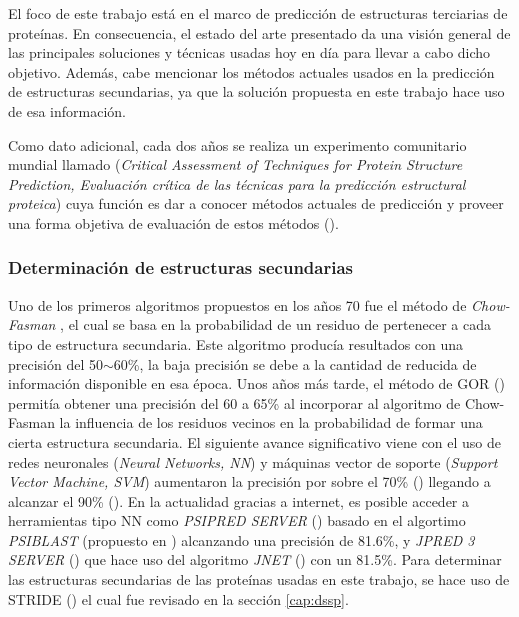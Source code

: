 El foco de este trabajo está en el marco de predicción de estructuras terciarias de proteínas. En consecuencia, el estado del arte presentado da una visión general de las principales soluciones y técnicas usadas hoy en día para llevar a cabo dicho objetivo. Además, cabe mencionar los métodos actuales usados en la predicción de estructuras secundarias, ya que la solución propuesta en este trabajo hace uso de esa información.

Como dato adicional, cada dos años se realiza un experimento comunitario mundial llamado  (\textit{Critical Assessment of Techniques for Protein Structure Prediction, Evaluación crítica de las técnicas para la predicción estructural proteica}) cuya función es dar a conocer métodos actuales de predicción y proveer una forma objetiva de evaluación de estos métodos (\citealp{casp:1995}). 

\subsubsection{Determinación de estructuras secundarias}

Uno de los primeros algoritmos propuestos en los años 70 fue el método de \textit{Chow-Fasman} \citealp{fasman:1974}, el cual se basa en la probabilidad de un residuo de pertenecer a cada tipo de estructura secundaria. Este algoritmo producía resultados con una precisión del 50$\sim$60\%, la baja precisión se debe a la cantidad de reducida de información disponible en esa época. Unos años más tarde, el método de GOR (\citealp{garnier:1978}) permitía obtener una precisión del 60 a 65\% al incorporar al algoritmo de Chow-Fasman la influencia de los residuos vecinos en la probabilidad de formar una cierta estructura secundaria. El siguiente avance significativo viene con el uso de redes neuronales (\textit{Neural Networks, NN}) y máquinas vector de soporte (\textit{Support Vector Machine, SVM}) aumentaron la precisión por sobre el 70\% (\citealp{Rost:1993}) llegando a alcanzar el 90\% (\citealp{Dor:2007}). En la actualidad gracias a internet, es posible acceder a herramientas tipo NN como \textit{PSIPRED SERVER} (\citealp{psipred:2013}) basado en el algortimo \textit{PSIBLAST} (propuesto en \citealp{psiblast:1997}) alcanzando una precisión de 81.6\%, y \textit{JPRED 3 SERVER} (\citealp{jpred:2008}) que hace uso del algoritmo \textit{JNET} (\citealp{jpred:2000}) con un 81.5\%. Para determinar las estructuras secundarias de las proteínas usadas en este trabajo, se hace uso de STRIDE (\citealp{stride:2004}) el cual fue revisado en la sección \ref{cap:dssp}.

